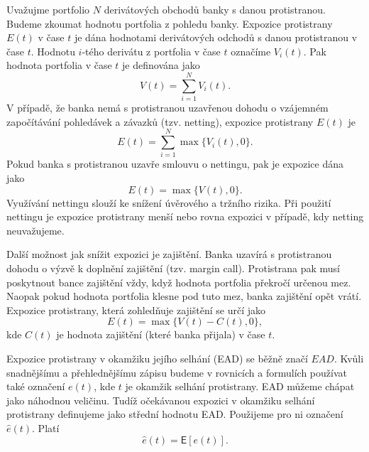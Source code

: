 \documentclass[a4paper,12pt]{report}
\theoremstyle{definition} \newtheorem{definice}[veta]{Definice}
\theoremstyle{remark}
\begin{document}
Uvažujme portfolio $N$ derivátových obchodů banky s danou protistranou.
Budeme zkoumat hodnotu portfolia z pohledu banky.
Expozice protistrany $E(t)$ v čase $t$ je dána hodnotami derivátových odchodů s danou protistranou v čase $t$.
Hodnotu $i$-tého derivátu z portfolia v čase $t$  označíme $V_i(t)$.
Pak hodnota portfolia v čase $t$ je definována jako
\begin{equation}
V(t)=\sum_{i=1}^N V_i(t).
\end{equation}
V případě, že banka nemá s protistranou uzavřenou dohodu o vzájemném započítávání pohledávek a závazků (tzv. netting), expozice protistrany $E(t)$ je 
\begin{equation}\label{exp_vztah}
E(t)=\sum_{i=1}^N\max\{V_i(t),0\}.
\end{equation}
Pokud banka s protistranou uzavře smlouvu o nettingu, pak je expozice dána jako
\begin{equation}\label{exp_vztah_net}
E(t)=\max\{V(t),0\}.
\end{equation}
Využívání nettingu slouží ke snížení úvěrového a tržního rizika. 
Při použití nettingu je expozice protistrany menší nebo rovna expozici v případě, kdy netting neuvažujeme. 

Další možnost jak snížit expozici je zajištění.
Banka uzavírá s protistranou dohodu o výzvě k doplnění zajištění (tzv. margin call).
Protistrana pak musí poskytnout bance zajištění vždy, když hodnota portfolia překročí určenou mez.
Naopak pokud hodnota portfolia klesne pod tuto mez, banka zajištění opět vrátí.
Expozice protistrany, která zohledňuje zajištění se určí jako
\begin{equation}\label{expozice_vztah}
E(t)=\max\{V(t)-C(t),0\},
\end{equation}
kde $C(t)$ je hodnota zajištění (které banka přijala) v čase $t$.  

Expozice protistrany v okamžiku jejího selhání (EAD) se běžně značí $EAD$.
Kvůli snadnějšímu a přehlednějšímu zápisu budeme v rovnicích a formulích používat také označení $e(t)$, kde $t$ je okamžik selhání protistrany.
EAD můžeme chápat jako náhodnou veličinu.
Tudíž očekávanou expozici v okamžiku selhání protistrany definujeme jako střední hodnotu EAD. Použijeme pro ni označení $\hat{e}(t)$.
Platí
\begin{equation}
\hat{e}(t)=\mathsf{E}[e(t)].
\end{equation}
\end{document}
